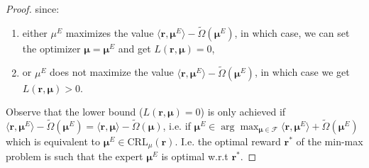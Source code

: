 \begin{proof}
    since:
    \begin{enumerate}
        \item either $\mu^E$ maximizes the value $\langle \bm{r}, \bm{\mu}^E \rangle - \tilde{\Omega}(\bm{\mu}^E)$, in which case, we can set the optimizer $\bm{\mu} = \bm{\mu}^E$ and get $ L(\bm{r},\bm{\mu})=0$,
        \item or  $\mu^E$ does not maximize the value $\langle \bm{r}, \bm{\mu}^E\rangle - \tilde{\Omega}(\bm{\mu}^E)$, in  which case we get $ L(\bm{r},\bm{\mu})>0$.
    \end{enumerate}
    Observe that the lower bound ($ L(\bm{r},\bm{\mu})=0$) is only achieved if $\langle \bm{r}, \bm{\mu}^E\rangle - \tilde{\Omega}(\bm{\mu}^E)= \langle \bm{r}, \bm{\mu} \rangle - \tilde{\Omega}(\bm{\mu})$, i.e. if $\bm{\mu}^E \in \arg \max_{\bm{\mu} \in \mathcal{F}} \langle \bm{r}, \bm{\mu}^E \rangle + \tilde{\Omega}(\bm{\mu}^E)$ which is equivalent to $\bm{\mu}^E \in  \text{CRL}_\mu(\bm{r})$. I.e. the optimal reward $\bm{r}^*$ of the min-max problem is such that the expert $\bm{\mu}^E$ is optimal w.r.t $\bm{r}^*$.
    
\end{proof}
